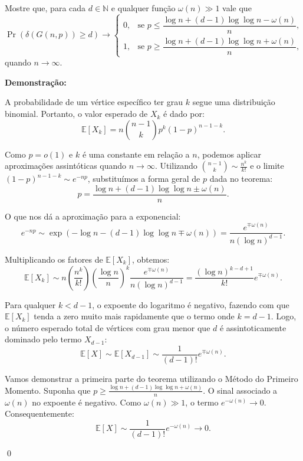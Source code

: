 \documentclass[12pt]{article}
\newenvironment{problem}[2][Exercício]{\begin{trivlist}
\item[\hskip \labelsep {\bfseries #1}\hskip \labelsep {\bfseries #2.}]}{\end{trivlist}}
\newenvironment{sol}
    {\textbf{Demonstração:}\emph{}
    }
    {
    \qed
    }
\begin{document}
\begin{problem}{15}
    Mostre que, para cada $d \in \mathbb{N}$ e qualquer função $\omega(n) \gg 1$ vale que
    \[
        \Pr(\delta(G(n,p)) \ge d) \to 
        \begin{cases}
            0, & \text{se } p \le \dfrac{\log n + (d-1)\log\log n - \omega(n)}{n}, \\[10pt]
            1, & \text{se } p \ge \dfrac{\log n + (d-1)\log\log n + \omega(n)}{n},
        \end{cases}
    \]
    quando $n \to \infty$.
\end{problem}
\begin{sol}
    A probabilidade de um vértice específico ter grau $k$ segue uma distribuição binomial. Portanto, o valor esperado de $X_k$ é dado por:
    \[\mathbb{E}[X_k] = n \binom{n-1}{k} p^k (1-p)^{n-1-k}.\]

    Como $p = o(1)$ e $k$ é uma constante em relação a $n$, podemos aplicar aproximações assintóticas quando $n \to \infty$. 
    Utilizando $\binom{n-1}{k} \sim \frac{n^k}{k!}$ e o limite $(1-p)^{n-1-k} \sim e^{-np}$, substituímos a forma geral de $p$ dada no teorema:
    \[p = \frac{\log n + (d-1)\log\log n \pm \omega(n)}{n}.\]

    O que nos dá a aproximação para a exponencial:
    \[e^{-np} \sim \exp\left(-\log n - (d-1)\log\log n \mp \omega(n)\right) = \frac{e^{\mp \omega(n)}}{n (\log n)^{d-1}}.\]

    Multiplicando os fatores de $\mathbb{E}[X_k]$, obtemos:
    \[\mathbb{E}[X_k] \sim n \left(\frac{n^k}{k!}\right) \left(\frac{\log n}{n}\right)^k \frac{e^{\mp \omega(n)}}{n (\log n)^{d-1}} = \frac{(\log n)^{k - d + 1}}{k!} e^{\mp \omega(n)}.\]

    Para qualquer $k < d - 1$, o expoente do logaritmo é negativo, fazendo com que $\mathbb{E}[X_k]$ tenda a zero muito mais rapidamente que o termo onde $k = d-1$. 
    Logo, o número esperado total de vértices com grau menor que $d$ é assintoticamente dominado pelo termo $X_{d-1}$:
    \[\mathbb{E}[X] \sim \mathbb{E}[X_{d-1}] \sim \frac{1}{(d-1)!} e^{\mp \omega(n)}.\]

    Vamos demonstrar a primeira parte do teorema utilizando o Método do Primeiro Momento. 
    Suponha que $p \ge \frac{\log n + (d-1)\log\log n + \omega(n)}{n}$. O sinal associado a $\omega(n)$ no expoente é negativo. 
    Como $\omega(n) \gg 1$, o termo $e^{-\omega(n)} \to 0$. Consequentemente:
    \[\mathbb{E}[X] \sim \frac{1}{(d-1)!} e^{-\omega(n)} \to 0.\]


\end{sol}
\end{document}
